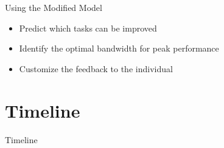 \documentclass[10pt]{beamer}
\begin{document}
\begin{frame}[fragile]{Using the Modified Model}
  \begin{itemize}
    \setlength\itemsep{1em}
    \item Predict which tasks can be improved
    \item Identify the optimal bandwidth for peak performance
    \item Customize the feedback to the individual
  \end{itemize}
\end{frame}

\section{Timeline}

\begin{frame}[fragile]{Timeline}
  \begin{center}
  \end{center}
\end{frame}
\end{document}
